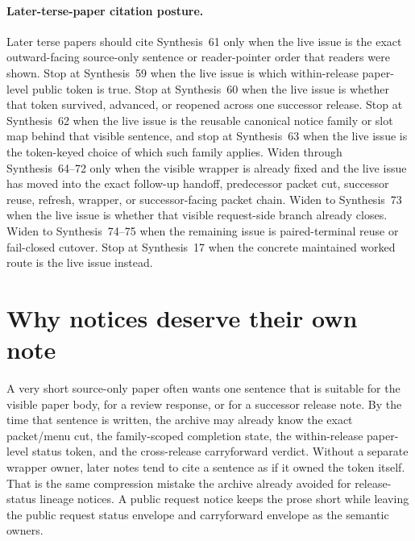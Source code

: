 \documentclass[11pt]{article}
\begin{document}
\paragraph{Later-terse-paper citation posture.}
Later terse papers should cite Synthesis~61 only when the live issue is the exact outward-facing source-only sentence or reader-pointer order that readers were shown. Stop at Synthesis~59 when the live issue is which within-release paper-level public token is true. Stop at Synthesis~60 when the live issue is whether that token survived, advanced, or reopened across one successor release. Stop at Synthesis~62 when the live issue is the reusable canonical notice family or slot map behind that visible sentence, and stop at Synthesis~63 when the live issue is the token-keyed choice of which such family applies. Widen through Synthesis~64--72 only when the visible wrapper is already fixed and the live issue has moved into the exact follow-up handoff, predecessor packet cut, successor reuse, refresh, wrapper, or successor-facing packet chain. Widen to Synthesis~73 when the live issue is whether that visible request-side branch already closes. Widen to Synthesis~74--75 when the remaining issue is paired-terminal reuse or fail-closed cutover. Stop at Synthesis~17 when the concrete maintained worked route is the live issue instead.\cite{series:publicrequeststatusenvelopes,series:publicrequestcarryforward,series:publicrequestnoticenormalforms,series:publicrequestnoticeselections,series:publicrequestresponsemenus,series:publicrequestresponsepackets,series:publicrequestresponsepacketcarryforward,series:publicrequestresponsepacketdeltaledgers,series:publicrequestresponsepacketrefreshnotices,series:publicrequestresponsepacketrefreshnoticenormalforms,series:publicrequestresponsepacketrefreshnoticeselections,series:publicrequestresponsepacketrefreshresponsemenus,series:publicrequestresponsepacketrefreshresponsepackets,series:publicrequestresponsepacketrefreshresponsepacketclosureverdicts,series:pairedterminalcitationdiscipline,series:pairedterminalcutoverrule,series:workedexample}

\section{Why notices deserve their own note}
A very short source-only paper often wants one sentence that is suitable for the visible paper body, for a review response, or for a successor release note.
By the time that sentence is written, the archive may already know the exact packet/menu cut, the family-scoped completion state, the within-release paper-level status token, and the cross-release carryforward verdict.
Without a separate wrapper owner, later notes tend to cite a sentence as if it owned the token itself.
That is the same compression mistake the archive already avoided for release-status lineage notices.
A public request notice keeps the prose short while leaving the public request status envelope and carryforward envelope as the semantic owners.
\end{document}
